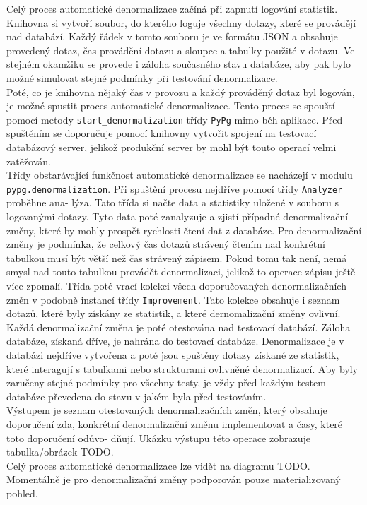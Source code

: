 \documentclass[ing,male,java,dept456]{diploma}						%
\begin{document}
Celý proces automatické denormalizace začíná při zapnutí logování statistik. Knihovna si vytvoří soubor, do kterého loguje všechny dotazy, které se provádějí nad databází. Každý řádek v tomto souboru je ve formátu JSON a obsahuje provedený dotaz, čas provádění dotazu a sloupce a tabulky použité v dotazu. Ve stejném okamžiku se provede i záloha současného stavu databáze, aby pak bylo možné simulovat stejné podmínky při testování denormalizace. \\
Poté, co je knihovna nějaký čas v provozu a každý prováděný dotaz byl logován, je možné spustit proces automatické denormalizace. Tento proces se spouští pomocí metody \lstinline[style=inlinepython]|start_denormalization| třídy \lstinline[style=inlinepython]|PyPg| mimo běh aplikace. Před spuštěním se doporučuje pomocí knihovny vytvořit spojení na testovací databázový server, jelikož produkční server by mohl být touto operací velmi zatěžován. \\
Třídy obstarávající funkčnost automatické denormalizace se nacházejí v modulu \lstinline[style=inlinepython]|pypg.denormalization|. Při spuštění procesu nejdříve pomocí třídy \lstinline[style=inlinepython]|Analyzer| proběhne ana- lýza. Tato třída si načte data a statistiky uložené v souboru s logovanými dotazy. Tyto data poté zanalyzuje a zjistí případné denormalizační změny, které by mohly prospět rychlosti čtení dat z databáze. Pro denormalizační změny je podmínka, že celkový čas dotazů strávený čtením nad konkrétní tabulkou musí být větší než čas strávený zápisem. Pokud tomu tak není, nemá smysl nad touto tabulkou provádět denormalizaci, jelikož to operace zápisu ještě více zpomalí. Třída poté vrací kolekci všech doporučovaných denormalizačních změn v podobně instancí třídy \lstinline[style=inlinepython]|Improvement|. Tato kolekce obsahuje i seznam dotazů, které byly získány ze statistik, a které dernomalizační změny ovlivní. \\
Každá denormalizační změna je poté otestována nad testovací databází. Záloha databáze, získaná dříve, je nahrána do testovací databáze. Denormalizace je v databázi nejdříve vytvořena a poté jsou spuštěny dotazy získané ze statistik, které interagují s tabulkami nebo strukturami ovlivněné denormalizací. Aby byly zaručeny stejné podmínky pro všechny testy, je vždy před každým testem databáze převedena do stavu v jakém byla před testováním. \\
Výstupem je seznam otestovaných denormalizačních změn, který obsahuje doporučení zda, konkrétní denormalizační změnu implementovat a časy, které toto doporučení odůvo- dňují. Ukázku výstupu této operace zobrazuje tabulka/obrázek TODO. \\
Celý proces automatické denormalizace lze vidět na diagramu TODO. Momentálně je pro denormalizační změny podporován pouze materializovaný pohled.
\end{document}
